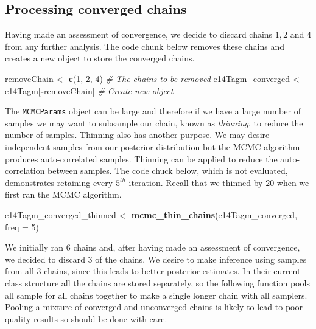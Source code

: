 \documentclass[9pt,a4paper,]{extarticle}
\newenvironment{Shaded}{\begin{snugshade}}{\end{snugshade}}
\newcommand{\CommentTok}[1]{\textcolor[rgb]{0.56,0.35,0.01}{\textit{#1}}}
\newcommand{\DataTypeTok}[1]{\textcolor[rgb]{0.13,0.29,0.53}{#1}}
\newcommand{\DecValTok}[1]{\textcolor[rgb]{0.00,0.00,0.81}{#1}}
\newcommand{\KeywordTok}[1]{\textcolor[rgb]{0.13,0.29,0.53}{\textbf{#1}}}
\newcommand{\NormalTok}[1]{#1}
\newcommand{\OperatorTok}[1]{\textcolor[rgb]{0.81,0.36,0.00}{\textbf{#1}}}
\newcommand{\StringTok}[1]{\textcolor[rgb]{0.31,0.60,0.02}{#1}}
\begin{document}
\hypertarget{processing-converged-chains}{%
\subsection{Processing converged chains}\label{processing-converged-chains}}

Having made an assessment of convergence, we decide to discard chains
\(1,2\) and \(4\) from any further analysis. The code chunk below removes
these chains and creates a new object to store the converged chains.

\begin{Shaded}
\begin{Highlighting}[]
\NormalTok{removeChain <-}\StringTok{ }\KeywordTok{c}\NormalTok{(}\DecValTok{1}\NormalTok{, }\DecValTok{2}\NormalTok{, }\DecValTok{4}\NormalTok{) }\CommentTok{# The chains to be removed}
\NormalTok{e14Tagm_converged <-}\StringTok{ }\NormalTok{e14Tagm[}\OperatorTok{-}\NormalTok{removeChain] }\CommentTok{# Create new object}
\end{Highlighting}
\end{Shaded}

The \texttt{MCMCParams} object can be large and therefore if we have a large
number of samples we may want to subsample our chain, known
as \emph{thinning}, to reduce the number of samples. Thinning also has
another purpose. We may desire independent samples from our posterior
distribution but the MCMC algorithm produces auto-correlated
samples. Thinning can be applied to reduce the auto-correlation between
samples. The code chuck below, which is not evaluated, demonstrates
retaining every \(5^{th}\) iteration. Recall that we thinned by \(20\)
when we first ran the MCMC algorithm.

\begin{Shaded}
\begin{Highlighting}[]
\NormalTok{e14Tagm_converged_thinned <-}\StringTok{ }\KeywordTok{mcmc_thin_chains}\NormalTok{(e14Tagm_converged, }\DataTypeTok{freq  =} \DecValTok{5}\NormalTok{)}
\end{Highlighting}
\end{Shaded}

We initially ran \(6\) chains and, after having made an assessment of
convergence, we decided to discard \(3\) of the chains. We desire to make
inference using samples from all \(3\) chains, since this leads to better
posterior estimates. In their current class structure all the chains
are stored separately, so the following function pools all sample for
all chains together to make a single longer chain with all
samplers. Pooling a mixture of converged and unconverged chains is
likely to lead to poor quality results so should be done with care.
\end{document}
